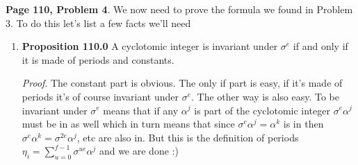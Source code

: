 \documentclass[aps,preprint,preprintnumbers,nofootinbib,showpacs,prd]{revtex4-1}
\begin{document}
{\bf Page 110, Problem 4}. We now need to prove the formula we found in Problem 3. To do this let's list a few facts we'll need
%
\begin{enumerate}
%
\item {\bf Proposition 110.0} A cyclotomic integer is invariant under $\sigma^e$ if and only if it is made of periods and constants.

{\it Proof}. The constant part is obvious. The only if part is easy, if it's made of periods it's of course invariant under $\sigma^e$. The other way is also easy. To be invariant under $\sigma^e$ means that if any $\alpha^j$ is part of the cyclotomic integer $\sigma^e \alpha^j$ must be in as well which in turn means that since $\sigma^e \alpha^j = \alpha^k$ is in then $\sigma^e \alpha^k = \sigma^{2e} \alpha^j$, etc are also in. But this is the definition of periods $\eta_i = \sum_{u = 0}^{f-1} \sigma^{ue} \alpha^j$ and we are done :) 


\end{enumerate}
\end{document}

